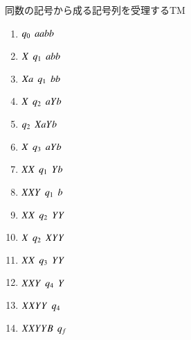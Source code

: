 \begin{myexample}{同数の記号から成る記号列を受理するTM}
 \begin{enumerate}
  \item $q_0\hspace{1ex} aabb$
  \item $X\hspace{1ex} q_1\hspace{1ex} abb$
  \item $Xa\hspace{1ex} q_1\hspace{1ex} bb$
  \item $X\hspace{1ex} q_2\hspace{1ex} aYb$
  \item $q_2\hspace{1ex} XaYb$
  \item $X\hspace{1ex} q_3\hspace{1ex} aYb$
  \item $XX\hspace{1ex} q_1\hspace{1ex} Yb$
  \item $XXY\hspace{1ex} q_1\hspace{1ex} b$
  \item $XX\hspace{1ex} q_2\hspace{1ex} YY$
  \item $X\hspace{1ex} q_2\hspace{1ex} XYY$
  \item $XX\hspace{1ex} q_3\hspace{1ex} YY$
  \item $XXY\hspace{1ex} q_4\hspace{1ex} Y$
  \item $XXYY\hspace{1ex} q_4$
  \item $XXYYB\hspace{1ex} q_f$
 \end{enumerate}
\end{myexample}

